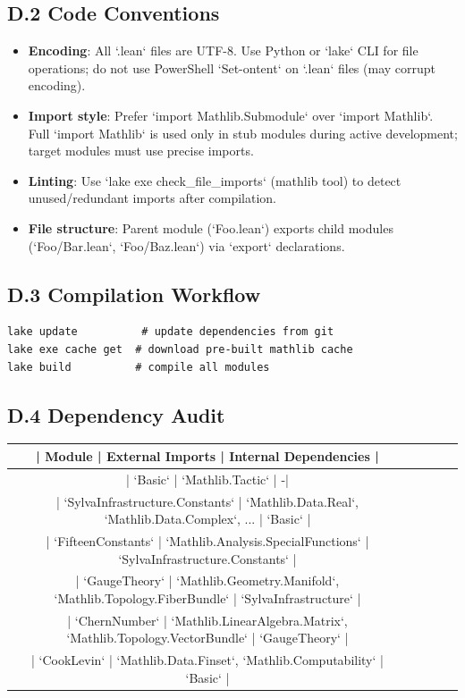 \documentclass[11pt,a4paper]{article}
\theoremstyle{plain}
\theoremstyle{definition}
\begin{document}
\subsection{D.2 Code Conventions}

\begin{itemize}
\item \textbf{Encoding}: All `.lean` files are UTF-8. Use Python or `lake` CLI for file operations; do not use PowerShell `Set-ontent` on `.lean` files (may corrupt encoding).
\item \textbf{Import style}: Prefer `import Mathlib.Submodule` over `import Mathlib`. Full `import Mathlib` is used only in stub modules during active development; target modules must use precise imports.
\item \textbf{Linting}: Use `lake exe check_file_imports` (mathlib tool) to detect unused/redundant imports after compilation.
\item \textbf{File structure}: Parent module (`Foo.lean`) exports child modules (`Foo/Bar.lean`, `Foo/Baz.lean`) via `export` declarations.

\end{itemize}
\subsection{D.3 Compilation Workflow}

\begin{verbatim}
lake update          # update dependencies from git
lake exe cache get  # download pre-built mathlib cache
lake build          # compile all modules
\end{verbatim}

\subsection{D.4 Dependency Audit}

\begin{table}[h]
\centering
\begin{tabular}{|c|c|c|c|c|}
\hline
| Module | External Imports | Internal Dependencies | \\ \hline
| `Basic` | `Mathlib.Tactic` | -| \\ \hline
| `SylvaInfrastructure.Constants` | `Mathlib.Data.Real`, `Mathlib.Data.Complex`, ... | `Basic` | \\ \hline
| `FifteenConstants` | `Mathlib.Analysis.SpecialFunctions` | `SylvaInfrastructure.Constants` | \\ \hline
| `GaugeTheory` | `Mathlib.Geometry.Manifold`, `Mathlib.Topology.FiberBundle` | `SylvaInfrastructure` | \\ \hline
| `ChernNumber` | `Mathlib.LinearAlgebra.Matrix`, `Mathlib.Topology.VectorBundle` | `GaugeTheory` | \\ \hline
| `CookLevin` | `Mathlib.Data.Finset`, `Mathlib.Computability` | `Basic` | \\ \hline
\end{tabular}
\end{table}
\end{document}
